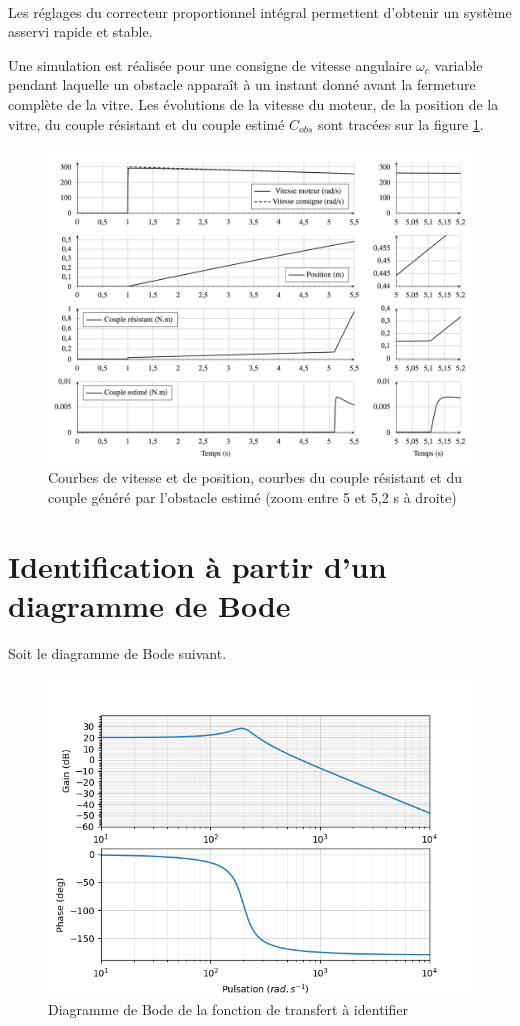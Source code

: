 ~\

Les réglages du correcteur proportionnel intégral permettent d’obtenir un système asservi rapide et stable.

Une simulation est réalisée pour une consigne de vitesse angulaire $\omega_c$ variable pendant laquelle un obstacle apparaît à un instant donné avant la fermeture complète de la vitre. Les évolutions de la vitesse du moteur, de la position de la vitre, du couple résistant et du couple estimé $C_{obs}$ sont tracées sur la figure \ref{img17}.

\begin{figure}[!h]
\centering\includegraphics[width=0.8\linewidth]{img/figure17}
 \caption{Courbes de vitesse et de position, courbes du couple résistant et du couple généré par l'obstacle estimé (zoom entre 5 et 5,2 s à droite)}
 \label{img17}
\end{figure}


\section{Identification à partir d'un diagramme de Bode}

Soit le diagramme de Bode suivant.

\begin{figure}[!h]
\centering\includegraphics[width=0.85\linewidth]{img/Q33}
 \caption{Diagramme de Bode de la fonction de transfert à identifier}
 \label{img18}
\end{figure}

